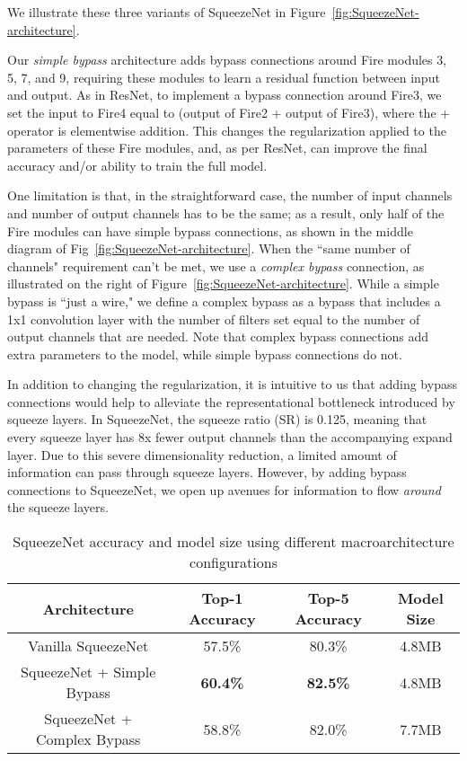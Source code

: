 \documentclass{article} \usepackage{iclr2017_conference,times}
\begin{document}
We illustrate these three variants of SqueezeNet in Figure~\ref{fig:SqueezeNet-architecture}.

Our {\em simple bypass} architecture adds bypass connections around Fire modules 3, 5, 7, and 9, requiring these modules to learn a residual function between input and output.
As in ResNet, to implement a bypass connection around Fire3, we set the input to Fire4 equal to (output of Fire2 + output of Fire3), where the + operator is elementwise addition.
This changes the regularization applied to the parameters of these Fire modules, and, as per ResNet, can improve the final accuracy and/or ability to train the full model.

One limitation is that, in the straightforward case, the number of input channels and number of output channels has to be the same; as a result, only half of the Fire modules can have simple bypass connections, as shown in the middle diagram of Fig~\ref{fig:SqueezeNet-architecture}.
When the ``same number of channels" requirement can't be met, we use a {\em complex bypass} connection, as illustrated on the right of Figure~\ref{fig:SqueezeNet-architecture}. 
While a simple bypass is ``just a wire," we define a complex bypass as a bypass that includes a 1x1 convolution layer with the number of filters set equal to the number of output channels that are needed.
Note that complex bypass connections add extra parameters to the model, while simple bypass connections do not.

In addition to changing the regularization, it is intuitive to us that adding bypass connections would help to alleviate the representational bottleneck introduced by squeeze layers.
In SqueezeNet, the squeeze ratio (SR) is 0.125, meaning that every squeeze layer has 8x fewer output channels than the accompanying expand layer.
Due to this severe dimensionality reduction, a limited amount of information can pass through squeeze layers.
However, by adding bypass connections to SqueezeNet, we open up avenues for information to flow {\em around} the squeeze layers.

\begin{table}[t]
	\centering
	\caption{SqueezeNet accuracy and model size using different macroarchitecture configurations}
	\label{table:macroarchitecture}
	\footnotesize
	\begin{tabulary}{0.9\textwidth}{|C|C|C|C|}
		\hline
		Architecture                & Top-1 Accuracy & Top-5 Accuracy & Model Size \\ \hline
		Vanilla SqueezeNet          & 57.5\%         & 80.3\%         & 4.8MB      \\ \hline
		SqueezeNet + Simple Bypass  & \bf{60.4}\%    & \bf{82.5}\%         & 4.8MB      \\ \hline
		SqueezeNet + Complex Bypass & 58.8\%         & 82.0\%           & 7.7MB     \\ \hline
	\end{tabulary}
\end{table}
\end{document}
